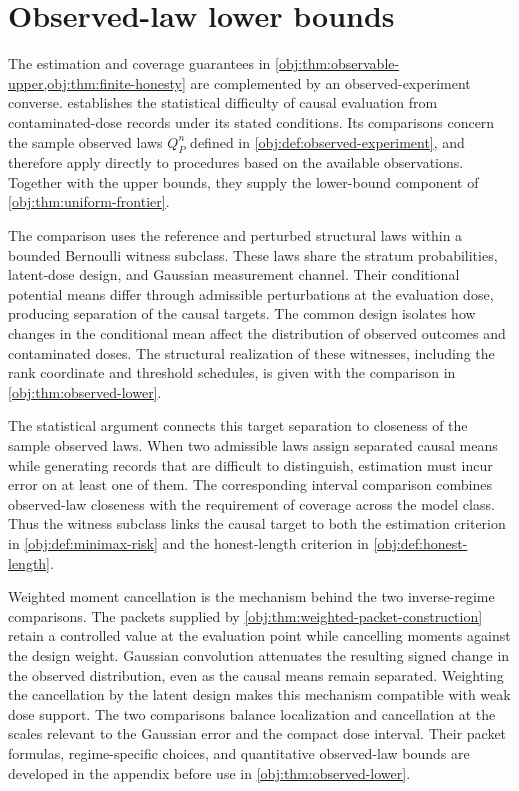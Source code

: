 \section{Observed-law lower bounds}

The estimation and coverage guarantees in \cref{obj:thm:observable-upper,obj:thm:finite-honesty} are complemented by an observed-experiment converse.  establishes the statistical difficulty of causal evaluation from contaminated-dose records under its stated conditions. Its comparisons concern the sample observed laws \(Q_P^n\) defined in \cref{obj:def:observed-experiment}, and therefore apply directly to procedures based on the available observations. Together with the upper bounds, they supply the lower-bound component of \cref{obj:thm:uniform-frontier}.

The comparison uses the reference and perturbed structural laws  within a bounded Bernoulli witness subclass. These laws share the stratum probabilities, latent-dose design, and Gaussian measurement channel. Their conditional potential means differ through admissible perturbations at the evaluation dose, producing separation of the causal targets. The common design isolates how changes in the conditional mean affect the distribution of observed outcomes and contaminated doses. The structural realization of these witnesses, including the rank coordinate and threshold schedules, is given with the comparison in \cref{obj:thm:observed-lower}.

The statistical argument connects this target separation to closeness of the sample observed laws. When two admissible laws assign separated causal means while generating records that are difficult to distinguish, estimation must incur error on at least one of them. The corresponding interval comparison combines observed-law closeness with the requirement of coverage across the model class. Thus the witness subclass links the causal target to both the estimation criterion in \cref{obj:def:minimax-risk} and the honest-length criterion in \cref{obj:def:honest-length}.

Weighted moment cancellation is the mechanism behind the two inverse-regime comparisons. The packets supplied by \cref{obj:thm:weighted-packet-construction} retain a controlled value at the evaluation point while cancelling moments against the design weight. Gaussian convolution attenuates the resulting signed change in the observed distribution, even as the causal means remain separated. Weighting the cancellation by the latent design makes this mechanism compatible with weak dose support. The two comparisons balance localization and cancellation at the scales relevant to the Gaussian error and the compact dose interval. Their packet formulas, regime-specific choices, and quantitative observed-law bounds are developed in the appendix before use in \cref{obj:thm:observed-lower}.

